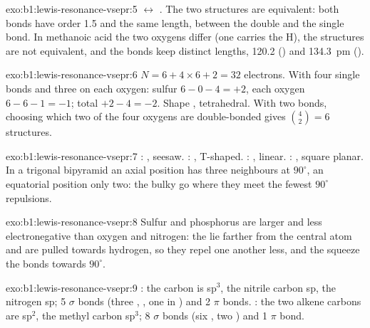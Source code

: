 \begin{solution}{exo:b1:lewis-resonance-vsepr:5}
$\leftrightarrow$
.
The two structures are equivalent: both  bonds have order 1.5 and
the same length, between the double and the single bond. In methanoic
acid the two oxygens differ (one carries the H), the structures are not
equivalent, and the bonds keep distinct lengths, 120.2 () and
\qty{134.3}{pm} ().
\end{solution}

\begin{solution}{exo:b1:lewis-resonance-vsepr:6}
$N = 6 + 4 \times 6 + 2 = 32$ electrons. With four single bonds and three
 on each oxygen: sulfur $6 - 0 - 4 = +2$, each oxygen
$6 - 6 - 1 = -1$; total $+2 - 4 = -2$. Shape , tetrahedral. With
two  bonds, choosing which two of the four oxygens are
double-bonded gives $\binom{4}{2} = 6$ structures.
\end{solution}

\begin{solution}{exo:b1:lewis-resonance-vsepr:7}
: , seesaw. : , T-shaped.
: , linear. : , square planar. In a
trigonal bipyramid an axial position has three neighbours at $90^\circ$,
an equatorial position only two: the bulky  go where they meet
the fewest $90^\circ$ repulsions.
\end{solution}

\begin{solution}{exo:b1:lewis-resonance-vsepr:8}
Sulfur and phosphorus are larger and less electronegative than oxygen and
nitrogen: the  lie farther from the central atom and are
pulled towards hydrogen, so they repel one another less, and the  squeeze the bonds towards $90^\circ$.
\end{solution}

\begin{solution}{exo:b1:lewis-resonance-vsepr:9}
: the  carbon is sp$^3$, the nitrile carbon sp, the
nitrogen sp; 5 $\sigma$ bonds (three , , one in
) and 2 $\pi$ bonds. : the two alkene carbons are
sp$^2$, the methyl carbon sp$^3$; 8 $\sigma$ bonds (six , two
) and 1 $\pi$ bond.
\end{solution}

